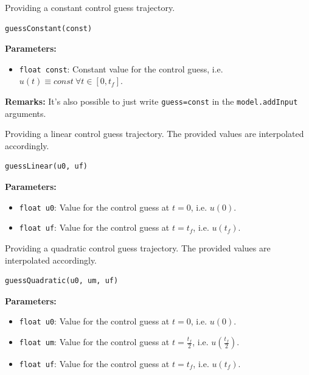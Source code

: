 \documentclass[12pt]{article}
\begin{document}
\begin{mdframed}[backgroundcolor=gray!10, roundcorner=10pt, linewidth=1pt]

	Providing a constant control guess trajectory.

	\begin{lstlisting}
guessConstant(const)
	\end{lstlisting}

	\textbf{Parameters:}
	\begin{itemize}
		\item \texttt{float const}: Constant value for the control
		      guess, i.e. $u(t) \equiv const ~ \forall t \in [0, t_f]$.
	\end{itemize}

	\textbf{Remarks:} It's also possible to just write \texttt{guess=const}
	in the \texttt{model.addInput} arguments.
\end{mdframed}

\begin{mdframed}[backgroundcolor=gray!10, roundcorner=10pt, linewidth=1pt]

	Providing a linear control guess trajectory. The provided values are
	interpolated accordingly.

	\begin{lstlisting}
guessLinear(u0, uf)
	\end{lstlisting}

	\textbf{Parameters:}
	\begin{itemize}
		\item \texttt{float u0}: Value for the control guess at $t=0$,
		      i.e. $u(0)$.
		\item \texttt{float uf}: Value for the control guess at
		      $t=t_f$, i.e. $u(t_f)$.
	\end{itemize}

\end{mdframed}

\begin{mdframed}[backgroundcolor=gray!10, roundcorner=10pt, linewidth=1pt]

	Providing a quadratic control guess trajectory. The provided values
	are interpolated accordingly.

	\begin{lstlisting}
guessQuadratic(u0, um, uf)
	\end{lstlisting}

	\textbf{Parameters:}
	\begin{itemize}
		\item \texttt{float u0}: Value for the control guess at $t=0$,
		      i.e. $u(0)$.
		\item \texttt{float um}: Value for the control guess at
		      $t=\frac{t_f}{2}$, i.e. $u(\frac{t_f}{2})$.
		\item \texttt{float uf}: Value for the control guess at
		      $t=t_f$, i.e. $u(t_f)$.
	\end{itemize}

\end{mdframed}
\end{document}
